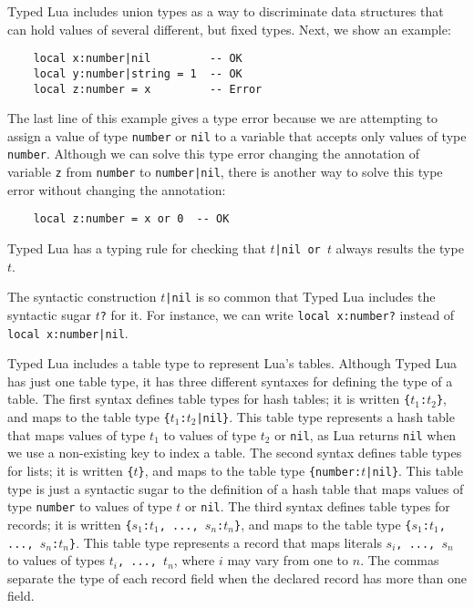 \documentclass[preprint]{sig-alternate}
\begin{document}
Typed Lua includes union types as a way to discriminate data
structures that can hold values of several different, but fixed types.
Next, we show an example:
\begin{verbatim}
    local x:number|nil         -- OK
    local y:number|string = 1  -- OK
    local z:number = x         -- Error
\end{verbatim}

The last line of this example gives a type error because we are
attempting to assign a value of type \verb'number' or \verb'nil'
to a variable that accepts only values of type \verb'number'.
Although we can solve this type error changing the annotation of
variable \verb'z' from \verb'number' to \verb'number|nil', there is
another way to solve this type error without changing the
annotation:
\begin{verbatim}
    local z:number = x or 0  -- OK
\end{verbatim}

Typed Lua has a typing rule for checking that $t$\verb'|nil or '$t$
always results the type $t$.

The syntactic construction $t$\verb'|nil' is so common that Typed Lua
includes the syntactic sugar $t$\verb'?' for it.
For instance, we can write \verb'local x:number?' instead of
\verb'local x:number|nil'.

Typed Lua includes a table type to represent Lua's tables.
Although Typed Lua has just one table type, it has three different
syntaxes for defining the type of a table.
The first syntax defines table types for hash tables;
it is written \verb'{'$t_{1}$\verb':'$t_{2}$\verb'}',
and maps to the table type \verb'{'$t_{1}$\verb':'$t_{2}$\verb'|nil}'.
This table type represents a hash table that maps values of type
$t_{1}$ to values of type $t_{2}$ or \verb'nil', as Lua returns
\verb'nil' when we use a non-existing key to index a table.
The second syntax defines table types for lists;
it is written \verb'{'$t$\verb'}',
and maps to the table type \verb'{number:'$t$\verb'|nil}'.
This table type is just a syntactic sugar to the definition of a
hash table that maps values of type \verb'number' to values of type
$t$ or \verb'nil'.
The third syntax defines table types for records;
it is written \verb'{'$s_{1}$\verb':'$t_{1}$\verb', ..., '$s_{n}$\verb':'$t_{n}$\verb'}',
and maps to the table type \verb'{'$s_{1}$\verb':'$t_{1}$\verb', ..., '$s_{n}$\verb':'$t_{n}$\verb'}'.
This table type represents a record that maps literals
$s_{i}$\verb', ..., '$s_{n}$ to values of types
$t_{i}$\verb', ..., '$t_{n}$, where $i$ may vary from one to $n$.
The commas separate the type of each record field when the declared
record has more than one field.
\end{document}
